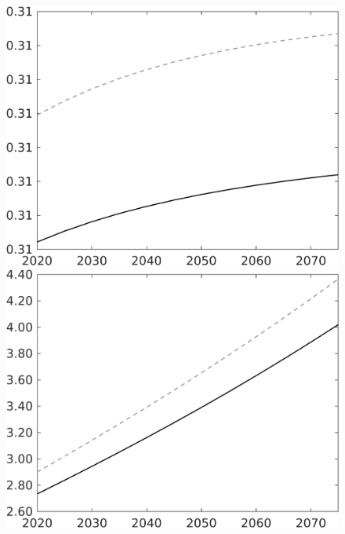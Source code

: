 \documentclass[12pt]{article}
\begin{document}
\begin{figure}[h!!]
\begin{minipage}[]{0.32\textwidth}
	\end{minipage}	
	\begin{minipage}[]{0.32\textwidth}
		\includegraphics[width=1\textwidth]{../../codding_model/own_basedOnFried/optimalPol_010922_revision/figures/all_13Sept22/LevTaufNoTauf_TaulCalib_regime0_hl_spillover0_nsk0_xgr0_knspil1_sep1_LFlimit0_emsbase0_countec0_GovRev0_etaa0.79_lgd0.png}
	\end{minipage}	
	\begin{minipage}[]{0.32\textwidth}
		\includegraphics[width=1\textwidth]{../../codding_model/own_basedOnFried/optimalPol_010922_revision/figures/all_13Sept22/LevTaufNoTauf_TaulCalib_regime0_wh_spillover0_nsk0_xgr0_knspil1_sep1_LFlimit0_emsbase0_countec0_GovRev0_etaa0.79_lgd0.png}

\end{minipage}
\end{figure}
\end{document}
